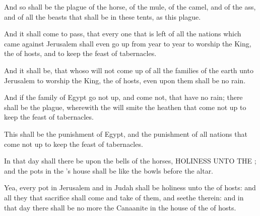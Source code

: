 \Verse And so shall be the plague of the horse, of the mule, of the camel, and of the ass, and of all the beasts that shall be in these tents, as this plague.

\Verse And it shall come to pass, that every one that is left of all the nations which came against Jerusalem shall even go up from year to year to worship the King, the \LORD of hosts, and to keep the feast of tabernacles.

\Verse And it shall be, that whoso will not come up of all the families of the earth unto Jerusalem to worship the King, the \LORD of hosts, even upon them shall be no rain.

\Verse And if the family of Egypt go not up, and come not, that have no rain; there shall be the plague, wherewith the \LORD will smite the heathen that come not up to keep the feast of tabernacles.

\Verse This shall be the punishment of Egypt, and the punishment of all nations that come not up to keep the feast of tabernacles.

\Verse In that day shall there be upon the bells of the horses, HOLINESS UNTO THE \LORD; and the pots in the \LORD's house shall be like the bowls before the altar.

\Verse Yea, every pot in Jerusalem and in Judah shall be holiness unto the \LORD of hosts: and all they that sacrifice shall come and take of them, and seethe therein: and in that day there shall be no more the Canaanite in the house of the \LORD of hosts.

